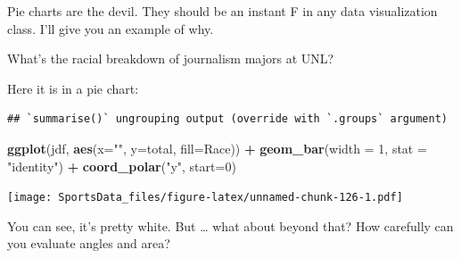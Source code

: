 \documentclass[
]{book}
\newenvironment{Shaded}{\begin{snugshade}}{\end{snugshade}}
\newcommand{\DataTypeTok}[1]{\textcolor[rgb]{0.13,0.29,0.53}{#1}}
\newcommand{\DecValTok}[1]{\textcolor[rgb]{0.00,0.00,0.81}{#1}}
\newcommand{\KeywordTok}[1]{\textcolor[rgb]{0.13,0.29,0.53}{\textbf{#1}}}
\newcommand{\NormalTok}[1]{#1}
\newcommand{\OperatorTok}[1]{\textcolor[rgb]{0.81,0.36,0.00}{\textbf{#1}}}
\newcommand{\StringTok}[1]{\textcolor[rgb]{0.31,0.60,0.02}{#1}}
\begin{document}
Pie charts are the devil. They should be an instant F in any data visualization class. I'll give you an example of why.

What's the racial breakdown of journalism majors at UNL?

Here it is in a pie chart:

\begin{Shaded}
\end{Shaded}

\begin{verbatim}
## `summarise()` ungrouping output (override with `.groups` argument)
\end{verbatim}

\begin{Shaded}
\begin{Highlighting}[]
\KeywordTok{ggplot}\NormalTok{(jdf, }\KeywordTok{aes}\NormalTok{(}\DataTypeTok{x=}\StringTok{""}\NormalTok{, }\DataTypeTok{y=}\NormalTok{total, }\DataTypeTok{fill=}\NormalTok{Race)) }\OperatorTok{+}\StringTok{ }\KeywordTok{geom_bar}\NormalTok{(}\DataTypeTok{width =} \DecValTok{1}\NormalTok{, }\DataTypeTok{stat =} \StringTok{"identity"}\NormalTok{) }\OperatorTok{+}\StringTok{ }\KeywordTok{coord_polar}\NormalTok{(}\StringTok{"y"}\NormalTok{, }\DataTypeTok{start=}\DecValTok{0}\NormalTok{)}
\end{Highlighting}
\end{Shaded}

\texttt{[image: SportsData\_files/figure-latex/unnamed-chunk-126-1.pdf]}

You can see, it's pretty white. But \ldots{} what about beyond that? How carefully can you evaluate angles and area?
\end{document}
